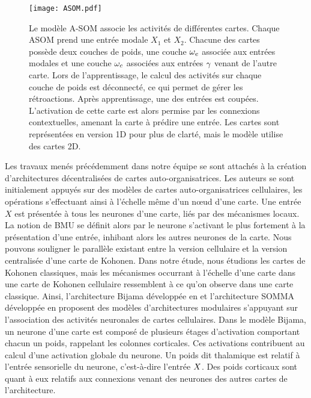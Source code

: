 \documentclass[../main]{subfiles}
\begin{document}
\begin{figure}
    \centering\texttt{[image: ASOM.pdf]}
    \caption{Le modèle A-SOM \cite{johnsson_associative_2009} associe les activités de différentes cartes. Chaque ASOM prend une entrée modale $X_1$ et $X_2$. Chacune des cartes possède deux couches de poids, une couche $\omega_e$ associée aux entrées modales et une couche $\omega_c$ associées aux entrées $\gamma$ venant de l'autre carte. Lors de l'apprentissage, le calcul des activités sur chaque couche de poids est déconnecté, ce qui permet de gérer les rétroactions. 
    Après apprentissage, une des entrées est coupées. L'activation de cette carte est alors permise par les connexions contextuelles, amenant la carte à prédire une entrée. Les cartes sont représentées en version 1D pour plus de clarté, mais le modèle utilise des cartes 2D.
    \label{fig:asom}}
\end{figure}

Les travaux menés précédemment dans notre équipe se sont attachés à la création d'architectures décentralisées de cartes auto-organisatrices.
Les auteurs se sont initialement appuyés sur des modèles de cartes auto-organisatrices cellulaires, les opérations s'effectuant ainsi à l'échelle même d'un n\oe{}ud d'une carte. Une entrée $X$ est présentée à tous les neurones d'une carte, liés par des mécanismes locaux. La notion de BMU se définit alors par le neurone s'activant le plus fortement à la présentation d'une entrée, inhibant alors les autres neurones de la carte.
Nous pouvons souligner le parallèle existant entre la version cellulaire et la version centralisée d'une carte de Kohonen. Dans notre étude, nous étudions les cartes de Kohonen classiques, mais les mécanismes occurrant à l'échelle d'une carte dans une carte de Kohonen cellulaire ressemblent à ce qu'on observe dans une carte classique.
Ainsi, l'architecture Bijama développée en \cite{menard05} et l'architecture SOMMA développée en \cite{lefort_unlearning_2011} proposent des modèles d'architectures modulaires s'appuyant sur l'association des activités neuronales de cartes cellulaires. 
Dans le modèle Bijama, un neurone d'une carte est composé de plusieurs étages d'activation comportant chacun un poids, rappelant les colonnes corticales. Ces activations contribuent au calcul d'une activation globale du neurone.
Un poids dit thalamique est relatif à l'entrée sensorielle du neurone, c'est-à-dire l'entrée $X$.
Des poids corticaux sont quant à eux relatifs aux connexions venant des neurones des autres cartes de l'architecture.
\end{document}
